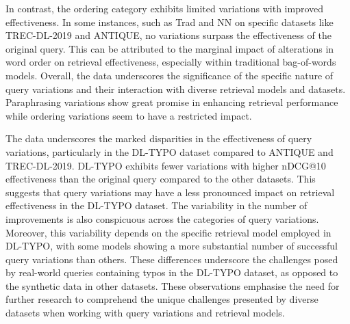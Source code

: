 In contrast, the ordering category exhibits limited variations with improved effectiveness. In some instances, such as Trad and NN on specific datasets like TREC-DL-2019 and ANTIQUE, no variations surpass the effectiveness of the original query. This can be attributed to the marginal impact of alterations in word order on retrieval effectiveness, especially within traditional bag-of-words models. Overall, the data underscores the significance of the specific nature of query variations and their interaction with diverse retrieval models and datasets. Paraphrasing variations show great promise in enhancing retrieval performance while ordering variations seem to have a restricted impact.

The data underscores the marked disparities in the effectiveness of query variations, particularly in the DL-TYPO dataset compared to ANTIQUE and TREC-DL-2019. DL-TYPO exhibits fewer variations with higher nDCG@10 effectiveness than the original query compared to the other datasets. This suggests that query variations may have a less pronounced impact on retrieval effectiveness in the DL-TYPO dataset. The variability in the number of improvements is also conspicuous across the categories of query variations. Moreover, this variability depends on the specific retrieval model employed in DL-TYPO, with some models showing a more substantial number of successful query variations than others. These differences underscore the challenges posed by real-world queries containing typos in the DL-TYPO dataset, as opposed to the synthetic data in other datasets. These observations emphasise the need for further research to comprehend the unique challenges presented by diverse datasets when working with query variations and retrieval models.
